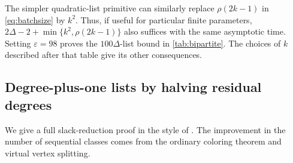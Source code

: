 \documentclass[11pt]{article}
\theoremstyle{definition}
\theoremstyle{remark}
\newcommand{\eps}{\varepsilon}
\begin{document}
The simpler quadratic-list primitive can similarly replace
$\rho(2k-1)$ in \eqref{eq:batchsize} by $k^2$. Thus, if useful for
particular finite parameters, $2\Delta-2+\min\{k^2,\rho(2k-1)\}$
also suffices with the same asymptotic time. Setting $\eps=98$ proves
the $100\Delta$-list bound in \cref{tab:bipartite}. The choices of $k$
described after that table give its other consequences.

\subsection{Degree-plus-one lists by halving residual degrees}
We give a full slack-reduction proof in the style of
\cite[Lemma 4.2]{BKO}. The improvement in the number of sequential
classes comes from the ordinary coloring theorem and virtual vertex
splitting.
\end{document}
